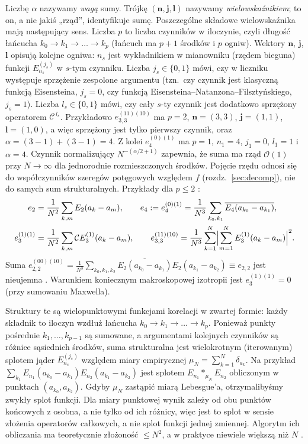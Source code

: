 \documentclass[12pt,a4paper,twoside,openright]{report}
\theoremstyle{definition}
\theoremstyle{remark}
\newcommand{\cc}[1]{\overline{#1}}
\begin{document}
Liczbę $\alpha$ nazywamy \emph{wagą} sumy. Trójkę $(\mathbf n,\mathbf j,\mathbf l)$ nazywamy \emph{wielowskaźnikiem}; to on, a nie jakiś „rząd”, identyfikuje sumę. Poszczególne składowe wielowskaźnika mają następujący sens. Liczba $p$ to liczba czynników w iloczynie, czyli długość łańcucha $k_0\to k_1\to\dots\to k_p$ (łańcuch ma $p+1$ środków i $p$ ogniw). Wektory $\mathbf n$, $\mathbf j$, $\mathbf l$ opisują kolejne ogniwa: $n_s$ jest wykładnikiem w mianowniku (rzędem bieguna) funkcji $E^{(j_s)}_{n_s}$ w $s$-tym czynniku. Liczba $j_s\in\{0,1\}$ mówi, czy w liczniku występuje sprzężenie zespolone argumentu (tzn.\ czy czynnik jest klasyczną funkcją Eisensteina, $j_s=0$, czy funkcją Eisensteina--Natanzona--Filsztyńskiego, $j_s=1$). Liczba $l_s\in\{0,1\}$ mówi, czy cały $s$-ty czynnik jest dodatkowo sprzężony operatorem $\mathcal C^{\,l_s}$. Przykładowo $e^{(11)(10)}_{3,3}$ ma $p=2$, $\mathbf n=(3,3)$, $\mathbf j=(1,1)$, $\mathbf l=(1,0)$, a więc sprzężony jest tylko pierwszy czynnik, oraz $\alpha=(3-1)+(3-1)=4$. Z kolei $e_4^{(0)(1)}$ ma $p=1$, $n_1=4$, $j_1=0$, $l_1=1$ i $\alpha=4$. Czynnik normalizujący $N^{-(\alpha/2+1)}$ zapewnia, że suma ma rząd $\mathcal O(1)$ przy $N\to\infty$ dla jednorodnie rozmieszczonych środków. Pojęcie rzędu odnosi się do współczynników szeregów potęgowych względem $f$ (rozdz.~\ref{sec:decomp}), nie do samych sum strukturalnych. Przykłady dla $p\le2$ \cite{czapla2025computational}:
\begin{align}
e_2&=\frac1{N^2}\sum_{k,m}E_2(a_k-a_m),\qquad e_4:=e_4^{(0)(1)}=\frac1{N^3}\sum_{k_0,k_1}\cc{E_4(a_{k_0}-a_{k_1})},\label{eq:ex1}\\
e_3^{(1)(1)}&=\frac1{N^2}\sum_{k,m}\mathcal C E_3^{(1)}(a_k-a_m),\qquad
e_{3,3}^{(11)(10)}=\frac1{N^3}\sum_{k=1}^N\Bigl|\sum_{m=1}^N E_3^{(1)}(a_k-a_m)\Bigr|^2.\label{eq:ex2}
\end{align}
Suma $e_{2,2}^{(00)(10)}=\frac1{N^3}\sum_{k_0,k_1,k_2}\cc{E_2(a_{k_0}-a_{k_1})}E_2(a_{k_1}-a_{k_2})\equiv e_{2,2}$ jest nieujemna \cite{czapla2025computational}. Warunkiem koniecznym makroskopowej izotropii jest $e_3^{(1)(1)}=0$ (przy sumowaniu Maxwella).

Struktury te są wielopunktowymi funkcjami korelacji w zwartej formie: każdy składnik to iloczyn wzdłuż łańcucha $k_0\to k_1\to\dots\to k_p$. Ponieważ punkty pośrednie $k_1,\dots,k_{p-1}$ są sumowane, a argumentami kolejnych czynników są różnice sąsiednich środków, suma strukturalna jest wielokrotnym (iterowanym) splotem jąder $E^{(j_s)}_{n_s}$ względem miary empirycznej $\mu_N=\sum_{k=1}^N\delta_{a_k}$. Na przykład $\sum_{k_1}E_{n_1}(a_{k_0}-a_{k_1})E_{n_2}(a_{k_1}-a_{k_2})$ jest splotem $E_{n_1}*_{\mu_N}E_{n_2}$ obliczonym w punktach $(a_{k_0},a_{k_2})$. Gdyby $\mu_N$ zastąpić miarą Lebesgue'a, otrzymalibyśmy zwykły splot funkcji. Dla miary punktowej wynik zależy od obu punktów końcowych z osobna, a nie tylko od ich różnicy, więc jest to splot w sensie złożenia operatorów całkowych, a nie splot funkcji jednej zmiennej. Algorytm ich obliczania ma teoretycznie złożoność $\le N^2$, a w praktyce niewiele większą niż $N$ \cite{mityushev2025computationalpart3}.
\end{document}

